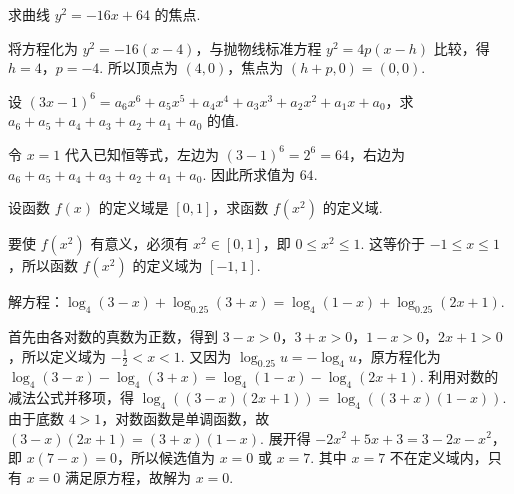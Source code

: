 \begin{problem}

求曲线 \(y^{2}=-16x+64\) 的焦点.

\begin{solution}
将方程化为 \(y^2=-16(x-4)\)，与抛物线标准方程 \(y^2=4p(x-h)\) 比较，得 \(h=4\)，\(p=-4\). 所以顶点为 \((4,0)\)，焦点为 \((h+p,0)=(0,0)\).
\end{solution}
\end{problem}

\begin{problem}

设 \((3x-1)^{6}=a_{6}x^{6}+a_{5}x^{5}+a_{4}x^{4}+a_{3}x^{3}+a_{2}x^{2}+a_{1}x+a_{0}\)，求 \(a_{6}+a_{5}+a_{4}+a_{3}+a_{2}+a_{1}+a_{0}\) 的值.

\begin{solution}
令 \(x=1\) 代入已知恒等式，左边为 \((3-1)^6=2^6=64\)，右边为 \(a_6+a_5+a_4+a_3+a_2+a_1+a_0\). 因此所求值为 \(64\).
\end{solution}
\end{problem}

\begin{problem}

设函数 \(f(x)\) 的定义域是 \([0,1]\)，求函数 \(f(x^2)\) 的定义域.

\begin{solution}
要使 \(f(x^2)\) 有意义，必须有 \(x^2\in[0,1]\)，即 \(0\leqslant x^2\leqslant1\). 这等价于 \(-1\leqslant x\leqslant1\)，所以函数 \(f(x^2)\) 的定义域为 \([-1,1]\).
\end{solution}
\end{problem}

\begin{problem}

解方程：\(\log_4(3-x)+\log_{0.25}(3+x)=\log_4(1-x)+\log_{0.25}(2x+1)\).

\begin{solution}
首先由各对数的真数为正数，得到 \(3-x>0\)，\(3+x>0\)，\(1-x>0\)，\(2x+1>0\)，所以定义域为 \(-\frac{1}{2}<x<1\). 又因为 \(\log_{0.25}u=-\log_4u\)，原方程化为 \(\log_4(3-x)-\log_4(3+x)=\log_4(1-x)-\log_4(2x+1)\). 利用对数的减法公式并移项，得 \(\log_4\left((3-x)(2x+1)\right)=\log_4\left((3+x)(1-x)\right)\). 由于底数 \(4>1\)，对数函数是单调函数，故 \((3-x)(2x+1)=(3+x)(1-x)\). 展开得 \(-2x^2+5x+3=3-2x-x^2\)，即 \(x(7-x)=0\)，所以候选值为 \(x=0\) 或 \(x=7\). 其中 \(x=7\) 不在定义域内，只有 \(x=0\) 满足原方程，故解为 \(x=0\).
\end{solution}
\end{problem}

